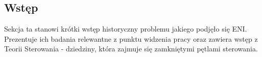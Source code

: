 \subsection{Wstęp}

Sekcja ta stanowi krótki wstęp historyczny problemu jakiego podjęło się ENI. Prezentuje ich badania relewantne z punktu widzenia pracy oraz zawiera wstęp z Teorii Sterowania - dziedziny, która zajmuje się zamkniętymi pętlami sterowania. 